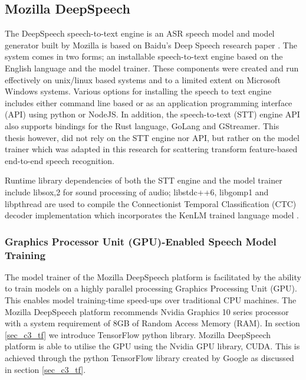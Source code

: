 \subsection{Mozilla DeepSpeech}\label{sec_c3_moz}
The DeepSpeech speech-to-text engine is an ASR speech model and model generator built by Mozilla is based on Baidu's Deep Speech research paper \citep{hannun2014deep}.  The system comes in two forms;  an installable speech-to-text engine based on the English language and the model trainer. These components were created and run effectively on unix/linux based systems and to a limited extent on Microsoft Windows systems.  Various options for installing the speech to text engine includes either command line based or as an application programming interface (API) using python or NodeJS.  In addition, the speech-to-text (STT) engine API also supports bindings for the Rust language, GoLang and GStreamer.  This thesis however, did not rely on the STT engine nor API, but rather on the model trainer which was adapted in this research for scattering transform feature-based end-to-end speech recognition.

Runtime library dependencies of both the STT engine and the model trainer include libsox,2 for sound processing of audio; libstdc++6, libgomp1 and libpthread are used to compile the Connectionist Temporal Classification (CTC) decoder implementation which incorporates the KenLM trained language model \cite{Heafield-estimate}.
\subsubsection{Graphics Processor Unit (GPU)-Enabled Speech Model Training}
The model trainer of the Mozilla DeepSpeech platform is facilitated by the ability to train models on a highly parallel processing Graphics Processing Unit (GPU).  This enables model training-time speed-ups over traditional CPU machines.  The Mozilla DeepSpeech platform recommends Nvidia Graphics 10 series processor with a system requirement of 8GB of Random Access Memory (RAM). In section \ref{sec_c3_tf} we introduce TensorFlow python library.  Mozilla DeepSpeech platform is able to utilise the GPU using the Nvidia GPU library, CUDA.  This is achieved through the python TensorFlow library created by Google as discussed in section \ref{sec_c3_tf}.
